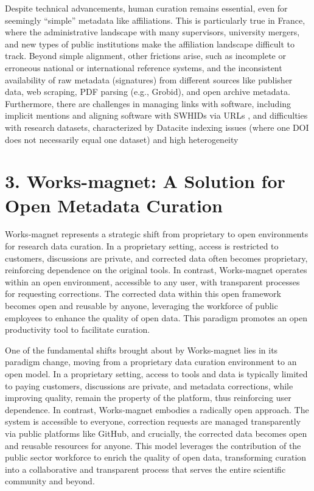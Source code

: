 \documentclass[
]{article}
\begin{document}
Despite technical advancements, human curation remains essential, even
for seemingly ``simple'' metadata like affiliations. This is
particularly true in France, where the administrative landscape with
many supervisors, university mergers, and new types of public
institutions make the affiliation landscape difficult to track. Beyond
simple alignment, other frictions arise, such as incomplete or erroneous
national or international reference systems, and the inconsistent
availability of raw metadata (signatures) from different sources like
publisher data, web scraping, PDF parsing (e.g., Grobid), and open
archive metadata. Furthermore, there are challenges in managing links
with software, including implicit mentions and aligning software with
SWHIDs via URLs , and difficulties with research datasets, characterized
by Datacite indexing issues (where one DOI does not necessarily equal
one dataset) and high heterogeneity

\hypertarget{works-magnet-a-solution-for-open-metadata-curation}{%
\section{3. Works-magnet: A Solution for Open Metadata
Curation}\label{works-magnet-a-solution-for-open-metadata-curation}}

Works-magnet represents a strategic shift from proprietary to open
environments for research data curation. In a proprietary setting,
access is restricted to customers, discussions are private, and
corrected data often becomes proprietary, reinforcing dependence on the
original tools. In contrast, Works-magnet operates within an open
environment, accessible to any user, with transparent processes for
requesting corrections. The corrected data within this open framework
becomes open and reusable by anyone, leveraging the workforce of public
employees to enhance the quality of open data. This paradigm promotes an
open productivity tool to facilitate curation.

One of the fundamental shifts brought about by Works-magnet lies in its
paradigm change, moving from a proprietary data curation environment to
an open model. In a proprietary setting, access to tools and data is
typically limited to paying customers, discussions are private, and
metadata corrections, while improving quality, remain the property of
the platform, thus reinforcing user dependence. In contrast,
Works-magnet embodies a radically open approach. The system is
accessible to everyone, correction requests are managed transparently
via public platforms like GitHub, and crucially, the corrected data
becomes open and reusable resources for anyone. This model leverages the
contribution of the public sector workforce to enrich the quality of
open data, transforming curation into a collaborative and transparent
process that serves the entire scientific community and beyond.
\end{document}
